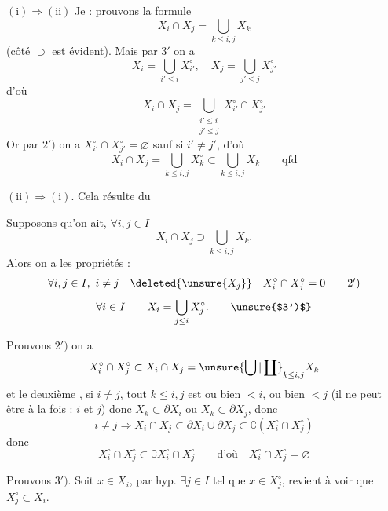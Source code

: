 
$(\mathrm{i})\Longrightarrow(\mathrm{ii})$ Je  : prouvons la formule
\[
X_i\cap X_j=\bigcup_{k\leq i,j}X_k
\]
(côté $\supset$ est évident). Mais par $3'$ on a
\[
X_i=\bigcup_{i'\leq i}X_{i'}^\circ,\quad X_j=\bigcup_{j'\leq j}X_{j'}^\circ
\]
d'où
\[
X_i\cap X_j=\bigcup_{\substack{i'\leq i\\j'\leq j}}X_{i'}^\circ\cap X_{j'}^\circ
\]
Or par $2')$ on a $X_{i'}^\circ\cap X_{j'}^\circ=\varnothing$ sauf si $i'\ne j'$, d'où
\[
X_i\cap X_j=\bigcup_{k\leq i,j}X_k^\circ\subset\bigcup_{k\leq i,j}X_k\qquad\text{qfd}
\]

$(\mathrm{ii})\Longrightarrow(\mathrm{i})$. Cela résulte du

  Supposons qu'on ait, $\forall i,j\in I$
\[
X_i\cap X_j\supset\bigcup_{k\leq i,j}X_k.
\]
Alors on a les propriétés :
\[
\forall i,j\in I,\ i\ne j\quad\deleted{\unsure{X_j}}\quad X_i^\circ\cap X_j^\circ=0\tag*{$2')$}
\]
\[
\forall i\in I\qquad X_i=\bigcup_{j\leq i}X_j^\circ.\tag*{\unsure{$3')$}}
\]

Prouvons $2')$ on a 
\[
X_i^\circ\cap X_j^\circ\subset X_i\cap X_j=\unsure{\bigcup|\coprod}_{k\leq i,j}X_k
\]
et le deuxième , si $i\ne j$,  tout $k\leq i,j$ est ou bien $<i$, ou bien $<j$ (il ne peut être  à la fois : $i$ et $j$) donc  $X_k\subset\partial X_i$ ou $X_k\subset\partial X_j$, donc
\[
i\ne j\Longrightarrow X_i\cap X_j\subset\partial X_i\cup\partial X_j\subset\complement(X_i^\circ\cap X_j^\circ)
\]
donc
\[
X_i^\circ\cap X_j^\circ\subset\complement X_i^\circ\cap X_j^\circ\qquad\text{d'où}\quad X_i^\circ\cap X_j^\circ=\varnothing
\]

Prouvons $3')$.  Soit $x\in X_i$, par hyp. $\exists j\in I$ tel que $x\in X_j^\circ$,  revient à voir que $X_j^\circ\subset X_i$.
